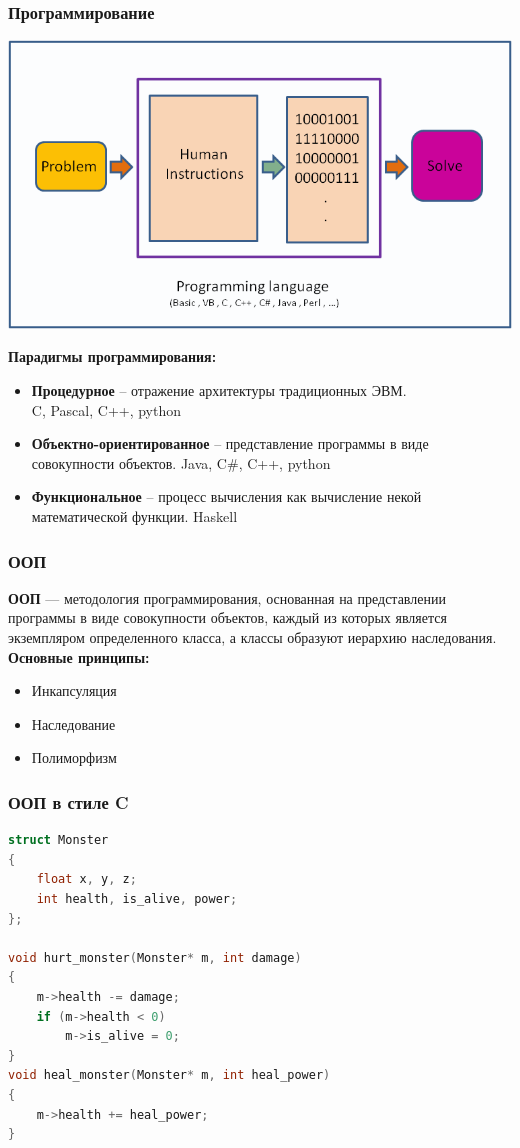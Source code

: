 \documentclass[10pt]{beamer}
\begin{document}
\begin{frame}[fragile]
\frametitle{Программирование} 
\begin{center}
\includegraphics[width=0.65\linewidth]{images/programming.png}
\end{center}
\textbf{Парадигмы программирования:}
\begin{itemize}
\item \textbf{Процедурное} -- отражение архитектуры традиционных ЭВМ.\\
C, Pascal, C++, python
\item \textbf{Объектно-ориентированное} -- представление программы в виде совокупности объектов.
Java, C\#, C++, python
\item \textbf{Функциональное} -- процесс вычисления как вычисление некой математической функции. Haskell
\end{itemize}
\end{frame}

\begin{frame}[fragile]
\frametitle{ООП} 
\textbf{ООП} — методология программирования, основанная на представлении программы в виде совокупности объектов, каждый из которых является экземпляром определенного класса, а классы образуют иерархию наследования. \\
\textbf{Основные принципы:}
\begin{itemize}
\item Инкапсуляция
\item Наследование
\item Полиморфизм
\end{itemize}
\end{frame}

\begin{frame}[fragile]
\frametitle{ООП в стиле C} 
\begin{lstlisting}[language=C++,basicstyle=\ttfamily,keywordstyle=\color{blue}]
struct Monster
{
    float x, y, z;
    int health, is_alive, power;
};

void hurt_monster(Monster* m, int damage)
{
    m->health -= damage;
    if (m->health < 0)
        m->is_alive = 0;
}
void heal_monster(Monster* m, int heal_power)
{
    m->health += heal_power;
}
\end{lstlisting}
\end{frame}
\end{document}
